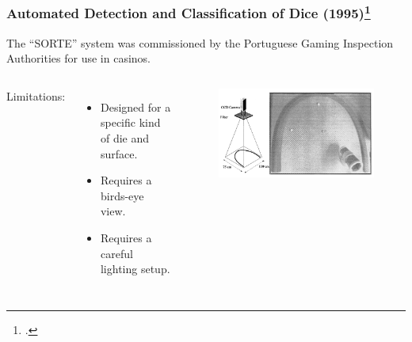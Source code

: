 \documentclass{beamer}
\begin{document}
\begin{frame}
\frametitle{Automated Detection and Classification of Dice (1995)\footcite{Correia1995}}

The ``SORTE'' system was commissioned by the Portuguese Gaming Inspection Authorities for use in casinos.

\vspace{\baselineskip}

\begin{columns}


Limitations:
\begin{itemize}
	\item Designed for a specific kind of die and surface.
	\item Requires a birds-eye view.
	\item Requires a careful lighting setup.
\end{itemize}


\begin{figure}
	\centering
	\includegraphics[width=\textwidth]{prior_1a}
\end{figure}

\end{columns}
	
\end{frame}
\end{document}
